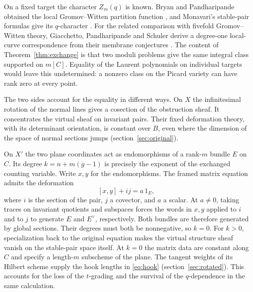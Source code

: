 On a fixed target the character $Z_m(q)$ is known. Bryan and
Pandharipande obtained the local Gromov--Witten partition function
\cite{bryanpandharipande}, and Monavari's stable-pair formulas give
its $q$-character \cite{monavari,refined}. For the related comparison
with fivefold Gromov--Witten theory, Giacchetto, Pandharipande and
Schuler derive a degree-one local-curve correspondence from their
membrane conjectures \cite{gps}. The content of
Theorem~\ref{thm:exchange} is that two moduli problems give the
same integral class supported on $m[C]$. Equality of the Laurent
polynomials on individual targets would leave this undetermined:
a nonzero class on the Picard variety can have rank zero at every
point.

The two sides account for the equality in different ways. On $X$
the infinitesimal rotation of the normal lines gives a cosection of
the obstruction sheaf. It concentrates the virtual sheaf on invariant
pairs. Their fixed deformation theory, with its determinant orientation,
is constant over $B$, even where the dimension of the space of normal
sections jumps (section~\ref{sec:original}).

On $X'$ the two plane coordinates act as endomorphisms of a rank-$m$
bundle $E$ on $C$. Its degree $k=n+m(g-1)$ is precisely the exponent
of the exchanged counting variable. Write $x,y$ for the endomorphisms.
The framed matrix equation admits the deformation
\[
                      [x,y]+ij=a\,1_E ,
\]
where $i$ is the section of the pair, $j$ a covector, and $a$ a scalar.
At $a\ne0$, taking traces on invariant quotients and subspaces forces
the words in $x,y$ applied to $i$ and to $j$ to generate $E$ and
$E^\vee$, respectively. Both bundles are therefore generated by global
sections. Their degrees must both be nonnegative, so $k=0$.
For $k>0$, specialization back to the original equation makes the
virtual structure sheaf vanish on the stable-pair space itself. At
$k=0$ the matrix data are constant along $C$ and specify a length-$m$
subscheme of the plane. The tangent weights of its Hilbert scheme
supply the hook lengths in \eqref{eq:hook}
(section~\ref{sec:rotated}). This accounts for the loss of the
$t$-grading and the survival of the $q$-dependence in the same calculation.

